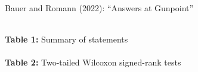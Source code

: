 \documentclass[xcolor=table,9pt,aspectratio=169]{beamer}
\begin{document}
\begin{frame}{\vspace*{10mm}Bauer and Romann (2022): ``Answers at Gunpoint''}
\vspace*{-5mm}
\begin{multicols}{2}
\begin{center}
   \\
   {\footnotesize\textbf{Table 1:} Summary of statements}\\
   \\
   {\footnotesize\textbf{Table 2:} Two-tailed Wilcoxon signed-rank tests}
\end{center}
\end{multicols}
\end{frame}
\end{document}
